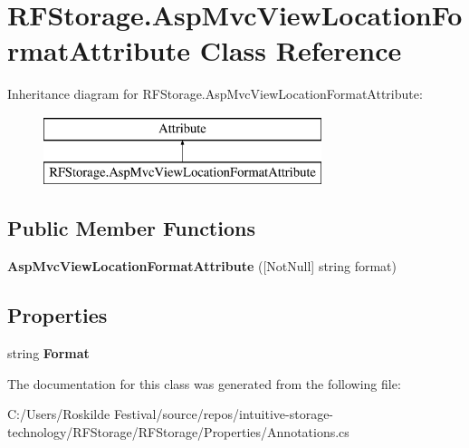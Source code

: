 \hypertarget{class_r_f_storage_1_1_asp_mvc_view_location_format_attribute}{}\section{R\+F\+Storage.\+Asp\+Mvc\+View\+Location\+Format\+Attribute Class Reference}
\label{class_r_f_storage_1_1_asp_mvc_view_location_format_attribute}
Inheritance diagram for R\+F\+Storage.\+Asp\+Mvc\+View\+Location\+Format\+Attribute\+:\begin{figure}[H]
\begin{center}
\leavevmode
\includegraphics[height=2.000000cm]{class_r_f_storage_1_1_asp_mvc_view_location_format_attribute}
\end{center}
\end{figure}
\subsection*{Public Member Functions}
\begin{DoxyCompactItemize}
\item 
\mbox{\label{class_r_f_storage_1_1_asp_mvc_view_location_format_attribute_aa963f0de8f83635ceb52b5f106e9ab3b}} 
{\bfseries Asp\+Mvc\+View\+Location\+Format\+Attribute} (\mbox{[}Not\+Null\mbox{]} string format)
\end{DoxyCompactItemize}
\subsection*{Properties}
\begin{DoxyCompactItemize}
\item 
\mbox{\label{class_r_f_storage_1_1_asp_mvc_view_location_format_attribute_a4f992fb22e935580f754aed601b71d96}} 
string {\bfseries Format}
\end{DoxyCompactItemize}


The documentation for this class was generated from the following file\+:\begin{DoxyCompactItemize}
\item 
C\+:/\+Users/\+Roskilde Festival/source/repos/intuitive-\/storage-\/technology/\+R\+F\+Storage/\+R\+F\+Storage/\+Properties/Annotations.\+cs\end{DoxyCompactItemize}
